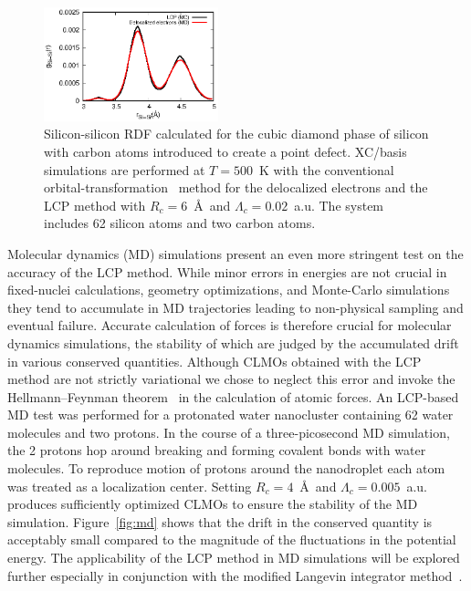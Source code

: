 \documentclass[aps,prl,twocolumn,reprint,amsmath,amssymb]{revtex4-1}
\begin{document}
\begin{figure}
\centering
\includegraphics[width=0.45\textwidth]{rdf_si}
\caption{Silicon-silicon RDF calculated for the cubic diamond phase of silicon with carbon atoms introduced to create a point defect. XC/basis simulations are performed at $T=500$~K with the conventional orbital-transformation~\cite{RZK-OT} method for the delocalized electrons and the LCP method with $R_c = 6$~\AA\ and $\Lambda_c = 0.02$~a.u. The system includes 62 silicon atoms and two carbon atoms.}
\label{fig:mc}
\end{figure}


Molecular dynamics (MD) simulations present an even more stringent test on the accuracy of the LCP method. While minor errors in energies are not crucial in fixed-nuclei calculations, geometry optimizations, and Monte-Carlo simulations they tend to accumulate in MD trajectories leading to non-physical sampling and eventual failure. Accurate calculation of forces is therefore crucial for molecular dynamics simulations, the stability of which are judged by the accumulated drift in various conserved quantities. Although CLMOs obtained with the LCP method are not strictly variational we chose to neglect this error and invoke the Hellmann--Feynman theorem~\cite{feynman1939forces} in the calculation of atomic forces. An LCP-based MD test was performed for a protonated water nanocluster containing 62 water molecules and two protons. In the course of a three-picosecond MD simulation, the 2 protons hop around breaking and forming covalent bonds with water molecules. To reproduce motion of protons around the nanodroplet each atom was treated as a localization center. Setting $R_c = 4$~\AA\ and $\Lambda_c = 0.005$~a.u. produces sufficiently optimized CLMOs to ensure the stability of the MD simulation. Figure~\ref{fig:md} shows that the drift in the conserved quantity is acceptably small compared to the magnitude of the fluctuations in the potential energy. The applicability of the LCP method in MD simulations will be explored further especially in conjunction with the modified Langevin integrator method~\cite{scheiber2018communication}. 
\end{document}
